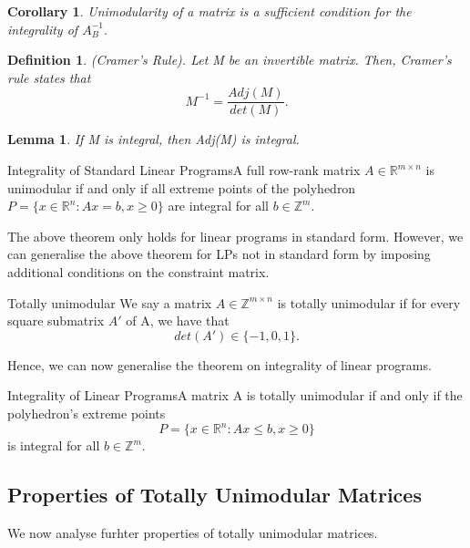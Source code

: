 \documentclass[twoside]{article}
\newtheorem{lemma}[theorem]{Lemma}
\newtheorem{corollary}[theorem]{Corollary}
\newtheorem{definition}[theorem]{Definition}
\begin{document}
\begin{corollary}Unimodularity of a matrix is a sufficient condition for the integrality of $A_B^{-1}.$
\end{corollary}

\begin{definition}(Cramer's Rule). Let M be an invertible matrix. Then, Cramer's rule states that 
$$
M^{-1} = \frac{Adj(M)}{det(M)}.
$$
\end{definition}


\begin{lemma}If M is integral, then Adj(M) is integral.
\end{lemma}


\begin{theorem_exam}{Integrality of Standard Linear Programs}{}A full row-rank matrix $A \in \mathbb{R}^{m \times n}$ is unimodular if and only if all extreme points of the polyhedron $P = \{x \in \mathbb{R}^n: Ax = b, x \geq 0\}$ are integral for all $b \in \mathbb{Z}^m.$
\end{theorem_exam}

The above theorem only holds for linear programs in standard form. However, we can generalise the above theorem for LPs not in standard form by imposing additional conditions on the constraint matrix.

\begin{definition_exam}{Totally unimodular}{} We say a matrix $A \in \mathbb{Z}^{m \times n}$ is totally unimodular if for every square submatrix $A'$ of A, we have that 
$$
det(A') \in \{-1, 0, 1\}.
$$
\end{definition_exam}

Hence, we can now generalise the theorem on integrality of linear programs.

\begin{theorem_exam}{Integrality of Linear Programs}{}A matrix A is totally unimodular if and only if the polyhedron's extreme points 
$$
P = \{x \in \mathbb{R}^n: Ax \leq b, x \geq 0\}
$$
is integral for all $b \in \mathbb{Z}^m$.
\end{theorem_exam}

\subsection{Properties of Totally Unimodular Matrices}
We now analyse furhter properties of totally unimodular matrices.
\end{document}

